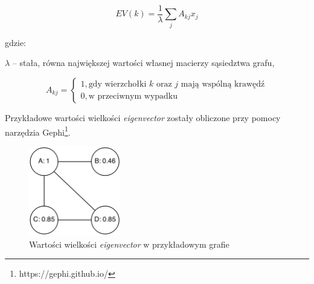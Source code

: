 \begin{equation}
EV(k) = \frac{1}{\lambda}\sum\limits_{j}A_{kj}x_j
\end{equation}

gdzie:

$\lambda$ -- stała, równa największej wartości własnej macierzy sąsiedztwa grafu,

\begin{equation}
 A_{kj} =
  \begin{cases}
   1, \text{gdy wierzchołki $k$ oraz $j$ mają wspólną krawędź} \\
   0, \text{w przeciwnym wypadku}
  \end{cases}
\end{equation}


\bigskip

Przykładowe wartości wielkości \textit{eigenvector} 
zostały obliczone przy pomocy narzędzia Gephi\footnote{https://gephi.github.io/}.

\begin{figure}[ht!]
\centering
\includegraphics[width=40mm]{img/eigenvector.png}
\caption{Wartości wielkości \textit{eigenvector} w przykładowym grafie}
\label{image:eigenvector}
\end{figure}


